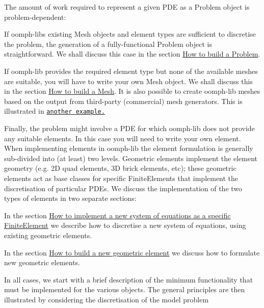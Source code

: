 The amount of work required to represent a given P\+DE as a {\ttfamily Problem} object is problem-\/dependent\+:
\begin{DoxyItemize}
\item If {\ttfamily oomph-\/lib\textquotesingle{}s} existing {\ttfamily Mesh} objects and element types are sufficient to discretise the problem, the generation of a fully-\/functional {\ttfamily Problem} object is straightforward. We shall discuss this case in the section \hyperlink{index_problem}{How to build a Problem}.
\item If {\ttfamily oomph-\/lib} provides the required element type but none of the available meshes are suitable, you will have to write your own {\ttfamily Mesh} object. We shall discuss this in the section \hyperlink{index_mesh}{How to build a Mesh}. It is also possible to create {\ttfamily oomph-\/lib} meshes based on the output from third-\/party (commercial) mesh generators. This is illustrated in \href{../../meshes/third_party_meshes/html/index.html}{\tt another example.}
\item Finally, the problem might involve a P\+DE for which {\ttfamily oomph-\/lib} does not provide any suitable elements. In this case you will need to write your own element. When implementing elements in {\ttfamily oomph-\/lib} the element formulation is generally sub-\/divided into (at least) two levels. Geometric elements implement the element geometry (e.\+g. 2D quad elements, 3D brick elements, etc); these geometric elements act as base classes for specific {\ttfamily Finite\+Elements} that implement the discretisation of particular P\+D\+Es. We discuss the implementation of the two types of elements in two separate sections\+:
\begin{DoxyItemize}
\item In the section \hyperlink{index_FEequations}{How to implement a new system of equations as a specific Finite\+Element} we describe how to discretise a new system of equations, using existing geometric elements.
\item In the section \hyperlink{index_FEgeom}{How to build a new geometric element} we discuss how to formulate new geometric elements.
\end{DoxyItemize}
\end{DoxyItemize}In all cases, we start with a brief description of the minimum functionality that must be implemented for the various objects. The general principles are then illustrated by considering the discretisation of the model problem

